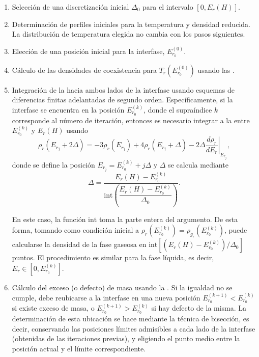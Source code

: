 \begin{enumerate}

\item Selecci\'on de una discretizaci\'on inicial $\Delta_0$ para el intervalo $[0,E_r(H)]$.

\item Determinaci\'on de perfiles iniciales para la temperatura y densidad reducida. La distribuci\'on de temperatura elegida no cambia con los pasos siguientes.

\item Elecci\'on de una posici\'on inicial para la interfase, $E_{r_0}^{(0)}$.

\item \label{itm:rhor_tr} C\'alculo de las densidades de coexistencia para $T_r(E_{r_0}^{(0)})$ usando las .

\item Integraci\'on de la  hacia ambos lados de la interfase usando esquemas de diferencias finitas adelantadas de segundo orden. Espec\'ificamente, si la interfase se encuentra en la posici\'on $E_{r_0}^{(k)}$, donde el supra\'indice $k$ corresponde al n\'umero de iteraci\'on, entonces es necesario integrar a la  entre $E_{r_0}^{(k)}$ y $E_r(H)$ usando
\begin{equation}
	\rho_r(E_{r_j} + 2\Delta) = -3\rho_r(E_{r_j}) + 4\rho_r(E_{r_j} + \Delta) - 2\Delta \left.\dfrac{d \rho_r}{d E_r} \right|_{E_{r_j}},
\end{equation}
donde se define la posici\'on $E_{r_j} = E_{r_0}^{(k)} + j\Delta$ y $\Delta$ se calcula mediante
\begin{equation}
	\Delta = \dfrac{E_r(H) - E_{r_0}^{(k)}}{\mbox{int} \left( \dfrac{E_r(H) - E_{r_0}^{(k)}}{\Delta_0} \right)}.
\end{equation}

En este caso, la funci\'on $\mbox{int}{}$ toma la parte entera del argumento. De esta forma, tomando como condici\'on inicial a $\rho_r(E_{r_0}^{(k)}) = \rho_{g_r}(E_{r_0}^{(k)})$, puede calcularse la densidad de la fase gaseosa en $\mbox{int}[ (E_r(H) - E_{r_0}^{(k)} )/\Delta_0 ]$ puntos. El procedimiento es similar para la fase l\'iquida, es decir, $E_r \in [0,E_{r_0}^{(k)}]$.

\item C\'alculo del exceso (o defecto) de masa usando la . Si la igualdad no se cumple, debe reubicarse a la interfase en una nueva posici\'on $E_{r_0}^{(k+1)} < E_{r_0}^{(k)}$ si existe exceso de masa, o $E_{r_0}^{(k+1)} > E_{r_0}^{(k)}$ si hay defecto de la misma. La determinaci\'on de esta ubicaci\'on se hace mediante la t\'ecnica de bisecci\'on, es decir, conservando las posiciones l\'imites admisibles a cada lado de la interfase (obtenidas de las iteraciones previas), y eligiendo el punto medio entre la posici\'on actual y el l\'imite correspondiente.


\end{enumerate}
